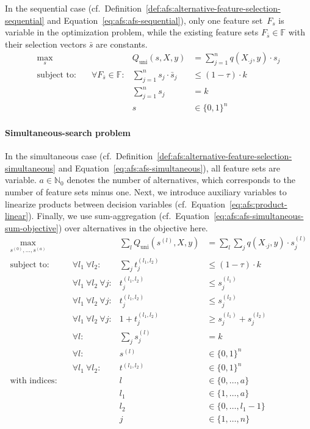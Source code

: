 In the sequential case (cf.~Definition~\ref{def:afs:alternative-feature-selection-sequential} and Equation~\ref{eq:afs:afs-sequential}), only one feature set~$F_s$ is variable in the optimization problem, while the existing feature sets $F_{\bar{s}} \in \mathbb{F}$ with their selection vectors $\bar{s}$ are constants.
%
\begin{equation}
	\begin{aligned}
		\max_s &\quad & Q_{\text{uni}}(s,X,y) &= \sum_{j=1}^{n} q(X_{\cdot{}j},y) \cdot s_j \\
		\text{subject to:} &\quad \forall F_{\bar{s}} \in \mathbb{F}: & \sum_{j=1}^n s_j \cdot \bar{s}_j &\leq (1 - \tau) \cdot k \\
		&\quad & \sum_{j=1}^n s_j &= k \\
		&\quad & s &\in \{0,1\}^n
	\end{aligned}
	\label{eq:afs:afs-sequential-complete}
\end{equation}
%
\paragraph{Simultaneous-search problem}

In the simultaneous case (cf.~Definition~\ref{def:afs:alternative-feature-selection-simultaneous} and Equation~\ref{eq:afs:afs-simultaneous}), all feature sets are variable.
$a \in \mathbb{N}_0$ denotes the number of alternatives, which corresponds to the number of feature sets minus one.
Next, we introduce auxiliary variables to linearize products between decision variables (cf.~Equation~\ref{eq:afs:product-linear}).
Finally, we use sum-aggregation (cf.~Equation~\ref{eq:afs:afs-simultaneous-sum-objective}) over alternatives in the objective here.
%
\begin{equation}
	\begin{aligned}
		\max_{s^{(0)}, \dots, s^{(a)}} &\quad & \sum_l Q_{\text{uni}}(s^{(l)},X,y) &= \sum_l \sum_j q(X_{\cdot{}j},y) \cdot s^{(l)}_j\\
		\text{subject to:} &\quad \forall l_1~\forall l_2: & \sum_j t^{(l_1,l_2)}_j &\leq (1 - \tau) \cdot k \\
		&\quad \forall l_1~\forall l_2~\forall j: & t^{(l_1,l_2)}_j &\leq s^{(l_1)}_j \\
		&\quad \forall l_1~\forall l_2~\forall j: & t^{(l_1,l_2)}_j &\leq s^{(l_2)}_j \\
		&\quad \forall l_1~\forall l_2~\forall j: & 1 + t^{(l_1,l_2)}_j &\geq s^{(l_1)}_j + s^{(l_2)}_j \\
		&\quad \forall l: & \sum_j s^{(l)}_j &= k \\
		&\quad \forall l: & s^{(l)} &\in \{0,1\}^n \\
		&\quad \forall l_1~\forall l_2: & t^{(l_1,l_2)} &\in \{0,1\}^n \\
		\text{with indices:} &\quad & l &\in \{0, \dots, a\} \\
		&\quad & l_1 &\in \{1, \dots, a\} \\
		&\quad & l_2 &\in \{0, \dots, l_1-1\} \\
		&\quad & j &\in \{1, \dots, n\}
	\end{aligned}
	\label{eq:afs:afs-simultaneous-complete}
\end{equation}

